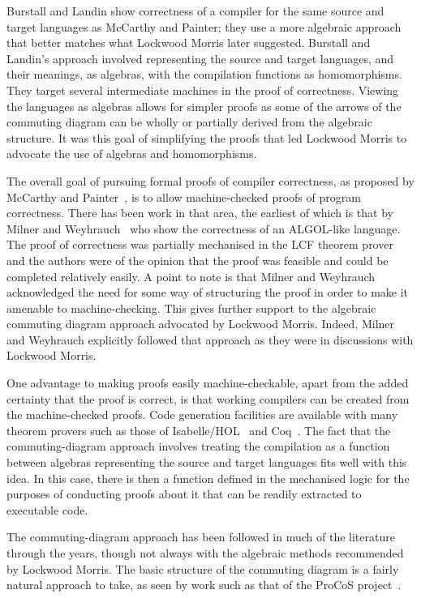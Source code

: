 \documentclass[a4paper,10pt]{report}
\begin{document}
Burstall and Landin show correctness of a compiler for the same source
and target languages as McCarthy and Painter; they use a more
algebraic approach that better matches what Lockwood Morris later
suggested.
Burstall and Landin's approach involved representing the source and
target languages, and their meanings, as algebras, with the
compilation functions as homomorphisms.
They target several intermediate machines in the proof of correctness.
Viewing the languages as algebras allows for simpler proofs as some of
the arrows of the commuting diagram can be wholly or partially derived
from the algebraic structure.
It was this goal of simplifying the proofs that led Lockwood Morris to
advocate the use of algebras and homomorphisms.

The overall goal of pursuing formal proofs of compiler correctness, as
proposed by McCarthy and Painter~\cite{mccarthy1967}, is to allow
machine-checked proofs of program correctness.
There has been work in that area, the earliest of which is that by
Milner and Weyhrauch~\cite{milner1972} who show the correctness of an
ALGOL-like language.
The proof of correctness was partially mechanised in the LCF theorem
prover~\cite{milner1972a} and the authors were of the opinion that the
proof was feasible and could be completed relatively easily.
A point to note is that Milner and Weyhrauch acknowledged the need for
some way of structuring the proof in order to make it amenable to
machine-checking.
This gives further support to the algebraic commuting diagram approach
advocated by Lockwood Morris.
Indeed, Milner and Weyhrauch explicitly followed that approach as they
were in discussions with Lockwood Morris.

One advantage to making proofs easily machine-checkable, apart from
the added certainty that the proof is correct, is that working
compilers can be created from the machine-checked proofs.
Code generation facilities are available with many theorem provers
such as those of Isabelle/HOL~\cite{haftmann2007} and
Coq~\cite{letouzey2003, letouzey2008}.
The fact that the commuting-diagram approach involves treating the
compilation as a function between algebras representing the source and
target languages fits well with this idea.
In this case, there is then a function defined in the mechanised logic
for the purposes of conducting proofs about it that can be readily
extracted to executable code.

The commuting-diagram approach has been followed in much of the
literature through the years, though not always with the algebraic
methods recommended by Lockwood Morris.
The basic structure of the commuting diagram is a fairly natural
approach to take, as seen by work such as that of the ProCoS
project~\cite{buth1992}.
\end{document}
